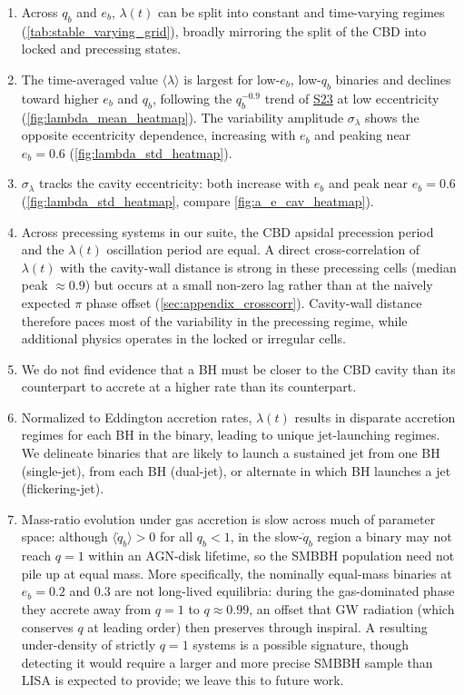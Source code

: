\documentclass[fleqn,usenatbib]{mnras}
\newcommand{\Stwentythree}{\href{https://doi.org/10.1093/mnras/stac3263}{S23}\xspace}
\begin{document}
\begin{enumerate}
    \item Across $q_b$ and $e_b$, $\lambda(t)$ can be split into constant and time-varying regimes (\autoref{tab:stable_varying_grid}), broadly mirroring the split of the CBD into locked and precessing states.
    \item The time-averaged value $\langle \lambda \rangle$ is largest for low-$e_b$, low-$q_b$ binaries and declines toward higher $e_b$ and $q_b$, following the $q_b^{-0.9}$ trend of \Stwentythree at low eccentricity (\autoref{fig:lambda_mean_heatmap}). The variability amplitude $\sigma_{\lambda}$ shows the opposite eccentricity dependence, increasing with $e_b$ and peaking near $e_b = 0.6$ (\autoref{fig:lambda_std_heatmap}).
    \item $\sigma_{\lambda}$ tracks the cavity eccentricity: both increase with $e_b$ and peak near $e_b = 0.6$ (\autoref{fig:lambda_std_heatmap}, compare \autoref{fig:a_e_cav_heatmap}).
    \item Across precessing systems in our suite, the CBD apsidal precession period and the $\lambda(t)$ oscillation period are equal. A direct cross-correlation of $\lambda(t)$ with the cavity-wall distance is strong in these precessing cells (median peak $\approx 0.9$) but occurs at a small non-zero lag rather than at the naively expected $\pi$ phase offset (\autoref{sec:appendix_crosscorr}). Cavity-wall distance therefore paces most of the variability in the precessing regime, while additional physics operates in the locked or irregular cells.
    \item We do not find evidence that a BH must be closer to the CBD cavity than its counterpart to accrete at a higher rate than its counterpart.
    \item Normalized to Eddington accretion rates, $\lambda(t)$ results in disparate accretion regimes for each BH in the binary, leading to unique jet-launching regimes. We delineate binaries that are likely to launch a sustained jet from one BH (single-jet), from each BH (dual-jet), or alternate in which BH launches a jet (flickering-jet).
    \item Mass-ratio evolution under gas accretion is slow across much of parameter space: although $\langle\dot{q}_b\rangle > 0$ for all $q_b < 1$, in the slow-$\dot{q}_b$ region a binary may not reach $q = 1$ within an AGN-disk lifetime, so the SMBBH population need not pile up at equal mass. More specifically, the nominally equal-mass binaries at $e_b = 0.2$ and $0.3$ are not long-lived equilibria: during the gas-dominated phase they accrete away from $q = 1$ to $q \approx 0.99$, an offset that GW radiation (which conserves $q$ at leading order) then preserves through inspiral. A resulting under-density of strictly $q = 1$ systems is a possible signature, though detecting it would require a larger and more precise SMBBH sample than LISA is expected to provide; we leave this to future work.
\end{enumerate}
\end{document}
